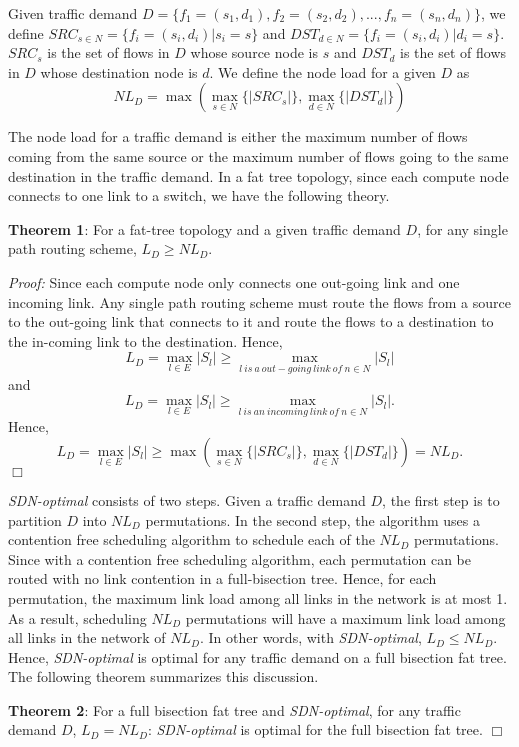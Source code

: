 Given traffic demand
$D = \{f_1=(s_1, d_1), f_2=(s_2, d_2), ..., f_n = (s_n, d_n)\}$, we define
$SRC_{s\in N} = \{f_i = (s_i, d_i) | s_i = s\}$ and $DST_{d\in N} =
\{f_i = (s_i, d_i) | d_i = s\}$.  $SRC_s$ is the set of flows in $D$ whose
source node is $s$ and $DST_d$ is the set of flows in $D$ whose destination
node is $d$. We define the node load for a given $D$ as 
\[NL_D = \max(\max_{s \in N} \{|SRC_s|\}, \max_{d \in N} \{|DST_d|\})\]

The node load for a traffic demand is either the maximum number of flows
coming from the same source or the maximum number of flows going to
the same destination in the traffic demand. In a fat tree topology, since
each compute node connects to one link to a switch, we have the following
theory.

{\bf Theorem 1}: For a fat-tree topology and a given traffic demand $D$,
for any single path routing scheme, $L_D \ge NL_D$.

{\em Proof:} Since each compute
node only connects one out-going link and one incoming link. Any single path
routing scheme must route the flows from a source to the out-going link that
connects to it and route the flows to a destination to the in-coming link
to the destination. Hence,
\[L_D = \max_{l\in E} {|S_l|} \ge \max_{l\ is\ a\ out-going\ link\ of\ n\in N} {|S_l|}\] and 
\[L_D = \max_{l\in E} {|S_l|} \ge \max_{l\ is\ an\ incoming\ link\ of\ n\in N} {|S_l|}.\]
Hence, 
\[L_D = \max_{l\in E} {|S_l|} \ge \max(\max_{s \in N} \{|SRC_s|\}, \max_{d \in N} \{|DST_d|\}) = NL_D.\] $\Box$

\textit{SDN-optimal} consists of two steps. Given a traffic demand $D$,
the first step is to partition $D$ into $NL_D$ permutations. In the second
step, the algorithm uses a contention free scheduling algorithm to schedule
each of the $NL_D$ permutations. Since with a contention free scheduling
algorithm, each permutation can be routed with no link contention in a
full-bisection tree. Hence, for each permutation, the maximum link load among
all links in the network
is at most 1. As a result, scheduling $NL_D$ permutations will
have a maximum link load among all links in the network of $NL_D$. In other
words, with \textit{SDN-optimal}, $L_D \le NL_D$. Hence, \textit{SDN-optimal}
is optimal for any traffic demand on a full bisection fat tree. The following
theorem summarizes this discussion. 

{\bf Theorem 2}: For a full bisection fat tree and
\textit{SDN-optimal}, for any traffic demand $D$, $L_D = NL_D$:
\textit{SDN-optimal} is optimal for the full bisection fat tree. 
$\Box$

